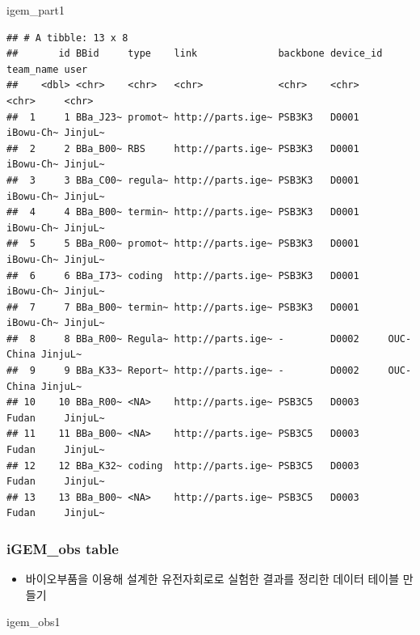\documentclass[
]{article}
\newenvironment{Shaded}{\begin{snugshade}}{\end{snugshade}}
\newcommand{\NormalTok}[1]{#1}
\providecommand{\tightlist}{%
  \setlength{\itemsep}{0pt}\setlength{\parskip}{0pt}}
\begin{document}
\begin{Shaded}
\begin{Highlighting}[]
\NormalTok{igem\_part1}
\end{Highlighting}
\end{Shaded}

\begin{verbatim}
## # A tibble: 13 x 8
##       id BBid     type    link              backbone device_id team_name user   
##    <dbl> <chr>    <chr>   <chr>             <chr>    <chr>     <chr>     <chr>  
##  1     1 BBa_J23~ promot~ http://parts.ige~ PSB3K3   D0001     iBowu-Ch~ JinjuL~
##  2     2 BBa_B00~ RBS     http://parts.ige~ PSB3K3   D0001     iBowu-Ch~ JinjuL~
##  3     3 BBa_C00~ regula~ http://parts.ige~ PSB3K3   D0001     iBowu-Ch~ JinjuL~
##  4     4 BBa_B00~ termin~ http://parts.ige~ PSB3K3   D0001     iBowu-Ch~ JinjuL~
##  5     5 BBa_R00~ promot~ http://parts.ige~ PSB3K3   D0001     iBowu-Ch~ JinjuL~
##  6     6 BBa_I73~ coding  http://parts.ige~ PSB3K3   D0001     iBowu-Ch~ JinjuL~
##  7     7 BBa_B00~ termin~ http://parts.ige~ PSB3K3   D0001     iBowu-Ch~ JinjuL~
##  8     8 BBa_R00~ Regula~ http://parts.ige~ -        D0002     OUC-China JinjuL~
##  9     9 BBa_K33~ Report~ http://parts.ige~ -        D0002     OUC-China JinjuL~
## 10    10 BBa_R00~ <NA>    http://parts.ige~ PSB3C5   D0003     Fudan     JinjuL~
## 11    11 BBa_B00~ <NA>    http://parts.ige~ PSB3C5   D0003     Fudan     JinjuL~
## 12    12 BBa_K32~ coding  http://parts.ige~ PSB3C5   D0003     Fudan     JinjuL~
## 13    13 BBa_B00~ <NA>    http://parts.ige~ PSB3C5   D0003     Fudan     JinjuL~
\end{verbatim}

\hypertarget{igem_obs-table}{%
\subsubsection{iGEM\_obs table}\label{igem_obs-table}}

\begin{itemize}
\tightlist
\item
  바이오부품을 이용해 설계한 유전자회로로 실험한 결과를 정리한 데이터
  테이블 만들기
\end{itemize}

\begin{Shaded}
\begin{Highlighting}[]
\NormalTok{igem\_obs1}
\end{Highlighting}
\end{Shaded}
\end{document}
